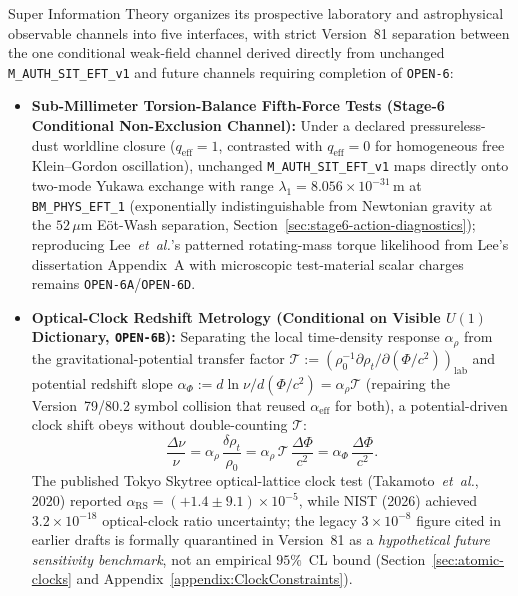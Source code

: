 Super Information Theory organizes its prospective laboratory and astrophysical observable channels into five interfaces, with strict Version~81 separation between the one conditional weak-field channel derived directly from unchanged \texttt{M\_AUTH\_SIT\_EFT\_v1} and future channels requiring completion of \texttt{OPEN-6}:
\begin{itemize}
  \item \textbf{Sub-Millimeter Torsion-Balance Fifth-Force Tests (Stage-6 Conditional Non-Exclusion Channel):} Under a declared pressureless-dust worldline closure ($q_{\mathrm{eff}} = 1$, contrasted with $q_{\mathrm{eff}} = 0$ for homogeneous free Klein--Gordon oscillation), unchanged \texttt{M\_AUTH\_SIT\_EFT\_v1} maps directly onto two-mode Yukawa exchange with range $\lambda_1 = 8.056\times 10^{-31}\,\mathrm{m}$ at \texttt{BM\_PHYS\_EFT\_1} (exponentially indistinguishable from Newtonian gravity at the $52\,\mu\mathrm{m}$ E\"ot-Wash separation, Section~\ref{sec:stage6-action-diagnostics}); reproducing Lee~\emph{et~al.}'s patterned rotating-mass torque likelihood from Lee's dissertation Appendix~A with microscopic test-material scalar charges remains \texttt{OPEN-6A}/\texttt{OPEN-6D}.
  \item \textbf{Optical-Clock Redshift Metrology (Conditional on Visible $U(1)$ Dictionary, \texttt{OPEN-6B}):} Separating the local time-density response $\alpha_\rho$ from the gravitational-potential transfer factor $\mathcal{T} := (\rho_0^{-1}\partial\rho_t/\partial(\Phi/c^2))_{\mathrm{lab}}$ and potential redshift slope $\alpha_\Phi := d\ln\nu/d(\Phi/c^2) = \alpha_\rho\mathcal{T}$ (repairing the Version~79/80.2 symbol collision that reused $\alpha_{\mathrm{eff}}$ for both), a potential-driven clock shift obeys without double-counting $\mathcal{T}$:
  \begin{equation}
  \frac{\Delta\nu}{\nu} = \alpha_\rho\,\frac{\delta\rho_t}{\rho_0} = \alpha_\rho\,\mathcal{T}\,\frac{\Delta\Phi}{c^2} = \alpha_\Phi\,\frac{\Delta\Phi}{c^2}.
  \label{eq:clock_shift_map_sec7}
  \end{equation}
  The published Tokyo Skytree optical-lattice clock test (Takamoto~\emph{et~al.}, 2020) reported $\alpha_{\mathrm{RS}} = (+1.4 \pm 9.1)\times 10^{-5}$, while NIST (2026) achieved $3.2\times 10^{-18}$ optical-clock ratio uncertainty; the legacy $3\times 10^{-8}$ figure cited in earlier drafts is formally quarantined in Version~81 as a \emph{hypothetical future sensitivity benchmark}, not an empirical $95\%$~CL bound (Section~\ref{sec:atomic-clocks} and Appendix~\ref{appendix:ClockConstraints}).

\end{itemize}
